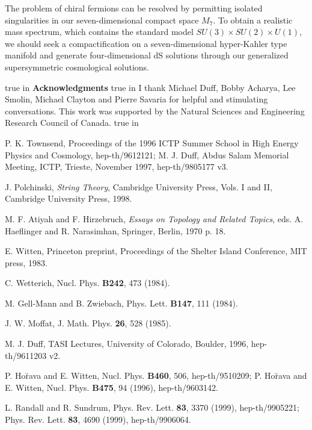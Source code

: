 \documentclass[a4paper,12pt]{article}
\begin{document}
The problem of chiral fermions can be resolved by permitting isolated
singularities in our seven-dimensional compact space $M_7$. To
obtain a realistic mass spectrum, which contains the standard
model $SU(3)\times SU(2)\times U(1)$, we should seek a compactification on a
seven-dimensional hyper-Kahler type manifold and generate four-dimensional dS
solutions through our generalized supersymmetric cosmological solutions.


 true in
{\bf Acknowledgments}
 true in
I thank Michael Duff, Bobby Acharya, Lee Smolin, Michael Clayton and Pierre Savaria
for helpful and stimulating conversations. This work was supported by the Natural
Sciences and Engineering Research Council of Canada.
 true in

\begin{thebibliography}{100}

 P. K. Townsend, Proceedings of the 1996 ICTP
Summer School in High Energy Physics and Cosmology,
hep-th/9612121; M. J. Duff, Abdus Salam Memorial Meeting, ICTP,
Trieste, November 1997, hep-th/9805177 v3.

 J. Polchinski, {\it String Theory},
Cambridge University Press, Vols. I and II, Cambridge University
Press, 1998.

 M. F. Atiyah and F. Hirzebruch, {\it Essays on
Topology and Related Topics}, eds. A. Haeflinger and R.
Narasimhan, Springer, Berlin, 1970 p. 18.

 E. Witten, Princeton preprint, Proceedings of the
Shelter Island Conference, MIT press, 1983.

 C. Wetterich, Nucl. Phys. {\bf B242}, 473 (1984).

 M. Gell-Mann and B. Zwiebach, Phys. Lett. {\bf
B147}, 111 (1984).

 J. W. Moffat, J. Math. Phys. {\bf 26}, 528
(1985).

 M. J. Duff, TASI Lectures, University of Colorado,
Boulder, 1996, hep-th/9611203 v2.

 P. Ho\u{r}ava and E. Witten, Nucl. Phys. {\bf
B460}, 506, hep-th/9510209; P. Ho\u{r}ava and E. Witten, Nucl. Phys.
{\bf B475}, 94 (1996), hep-th/9603142.

 L. Randall and R. Sundrum, Phys. Rev. Lett.
{\bf 83}, 3370 (1999), hep-th/9905221; Phys. Rev. Lett. {\bf 83},
4690 (1999), hep-th/9906064.


\end{thebibliography}
\end{document}
